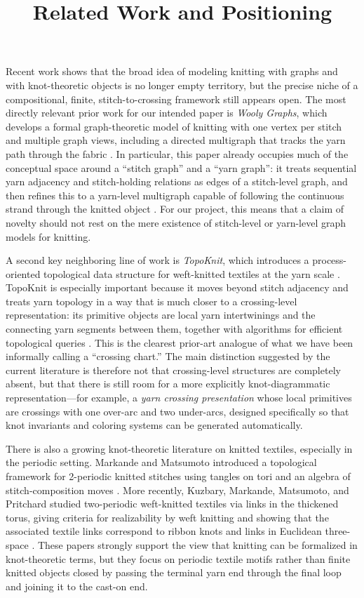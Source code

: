 \documentclass[11pt]{article}
\title{Related Work and Positioning}
\author{}
\date{}
\begin{document}
\maketitle
\thispagestyle{empty}

Recent work shows that the broad idea of modeling knitting with graphs and with knot-theoretic objects is no longer empty territory, but the precise niche of a compositional, finite, stitch-to-crossing framework still appears open. The most directly relevant prior work for our intended paper is \emph{Wooly Graphs}, which develops a formal graph-theoretic model of knitting with one vertex per stitch and multiple graph views, including a directed multigraph that tracks the yarn path through the fabric \cite{gray2024wooly}. In particular, this paper already occupies much of the conceptual space around a ``stitch graph'' and a ``yarn graph'': it treats sequential yarn adjacency and stitch-holding relations as edges of a stitch-level graph, and then refines this to a yarn-level multigraph capable of following the continuous strand through the knitted object \cite{gray2024wooly}. For our project, this means that a claim of novelty should not rest on the mere existence of stitch-level or yarn-level graph models for knitting.

A second key neighboring line of work is \emph{TopoKnit}, which introduces a process-oriented topological data structure for weft-knitted textiles at the yarn scale \cite{kapllani2021topoknit}. TopoKnit is especially important because it moves beyond stitch adjacency and treats yarn topology in a way that is much closer to a crossing-level representation: its primitive objects are local yarn intertwinings and the connecting yarn segments between them, together with algorithms for efficient topological queries \cite{kapllani2021topoknit}. This is the clearest prior-art analogue of what we have been informally calling a ``crossing chart.'' The main distinction suggested by the current literature is therefore not that crossing-level structures are completely absent, but that there is still room for a more explicitly knot-diagrammatic representation---for example, a \emph{yarn crossing presentation} whose local primitives are crossings with one over-arc and two under-arcs, designed specifically so that knot invariants and coloring systems can be generated automatically.

There is also a growing knot-theoretic literature on knitted textiles, especially in the periodic setting. Markande and Matsumoto introduced a topological framework for 2-periodic knitted stitches using tangles on tori and an algebra of stitch-composition moves \cite{markande2020knotty}. More recently, Kuzbary, Markande, Matsumoto, and Pritchard studied two-periodic weft-knitted textiles via links in the thickened torus, giving criteria for realizability by weft knitting and showing that the associated textile links correspond to ribbon knots and links in Euclidean three-space \cite{kuzbary2025study}. These papers strongly support the view that knitting can be formalized in knot-theoretic terms, but they focus on periodic textile motifs rather than finite knitted objects closed by passing the terminal yarn end through the final loop and joining it to the cast-on end.
\end{document}
